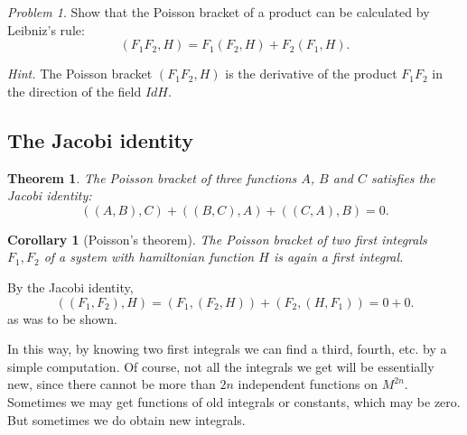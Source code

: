 \documentclass[leqno]{report}
\numberwithin{equation}{section}
\theoremstyle{plain}
\newtheorem*{thm*}{Theorem}
\newtheorem*{cor*}{Corollary}
\let\oldendproof\endproof
\renewenvironment{proof}[1][\proofname]{%
  \oldproof[\textsc{#1}]%
}{\oldendproof}
\theoremstyle{definition}
\theoremstyle{remark}
\theoremstyle{smallcap}
\newtheorem{prob}{Problem}
\numberwithin{prob}{section}
\newcommand{\hint}[1]{\textit{Hint.} #1}
\begin{document}
\begin{prob}
  Show that the Poisson bracket of a product can be calculated by Leibniz's rule:
  $$
  (F_1 F_2, H) = F_1 (F_2, H) + F_2 (F_1, H).
  $$

  \hint{The Poisson bracket $(F_1 F_2, H)$ is the derivative of the product $F_1 F_2$
  in the direction of the field $IdH$.}

\end{prob}


\subsection{The Jacobi identity}

\begin{thm*}
  The Poisson bracket of three functions $A$, $B$ and $C$
  satisfies the Jacobi identity:
  $$
  ((A, B), C) + ((B, C), A) + ((C, A), B) = 0.
  $$
\end{thm*}

\begin{cor*}[Poisson's theorem]
  The Poisson bracket of two first integrals $F_1, F_2$
  of a system with hamiltonian function $H$
  is again a first integral.
\end{cor*}

\begin{proof}[Proof of the corollary]
  By the Jacobi identity,
  $$
  ((F_1, F_2), H)
  =
  (F_1, (F_2, H))
  +
  (F_2, (H, F_1)) = 0 + 0.
  $$
  as was to be shown.
\end{proof}

In this way, by knowing two first integrals we can find a third, fourth, etc.
by a simple computation.
%
Of course, not all the integrals we get will be essentially new,
since there cannot be more than $2n$ independent functions on $M^{2n}$.
%
Sometimes we may get functions of old integrals or constants,
which may be zero.
%
But sometimes we do obtain new integrals.
\end{document}
